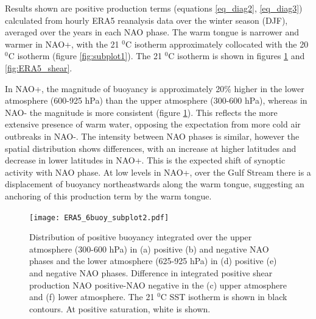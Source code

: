 Results shown are positive production terms (equations \ref{eq_diag2}, \ref{eq_diag3}) calculated from hourly ERA5 reanalysis data over the winter season (DJF), averaged over the years in each NAO phase. The warm tongue is narrower and warmer in NAO+, with the 21 $^{0}$C isotherm approximately collocated with the 20 $^{0}$C isotherm (figure \ref{fig:subplot1}). The 21 $^{0}$C isotherm is shown in figures \ref{fig:ERA5_buoy} and \ref{fig:ERA5_shear}.

In NAO+, the magnitude of buoyancy is approximately 20\% higher in the lower atmosphere (600-925 hPa) than the upper atmosphere (300-600 hPa), whereas in NAO- the magnitude is more consistent (figure \ref{fig:ERA5_buoy}). This reflects the more extensive presence of warm water, opposing the expectation from more cold air outbreaks in NAO-. The intensity between NAO phases is similar, however the spatial distribution shows differences, with an increase at higher latitudes and decrease in lower latitudes in NAO+. This is the expected shift of synoptic activity with NAO phase. At low levels in NAO+, over the Gulf Stream there is a displacement of buoyancy northeastwards along the warm tongue, suggesting an anchoring of this production term by the warm tongue.


\begin{figure}[h]
	\centering
	\texttt{[image: ERA5\_6buoy\_subplot2.pdf]}
	\caption{Distribution of positive buoyancy integrated over the upper atmosphere (300-600 hPa) in (a) positive (b) and negative NAO phases and the lower atmosphere (625-925 hPa) in (d) positive (e) and negative NAO phases. Difference in integrated positive shear production NAO positive-NAO negative in the (c) upper atmosphere and (f) lower atmosphere. The 21 $^{0}$C SST isotherm is shown in black contours. At positive saturation, white is shown.}
	\label{fig:ERA5_buoy}
\end{figure}



